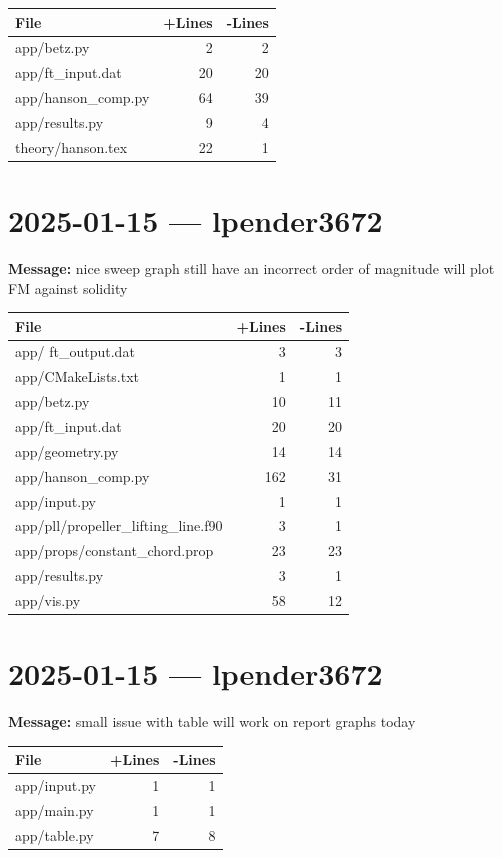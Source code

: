 \documentclass{article}
\begin{document}
\begin{longtable}{|p{10cm}|r|r|}
\hline \textbf{File} & \textbf{+Lines} & \textbf{-Lines} \\
\hline
app/betz.py & 2 & 2 \\
\hline
app/ft\_input.dat & 20 & 20 \\
\hline
app/hanson\_comp.py & 64 & 39 \\
\hline
app/results.py & 9 & 4 \\
\hline
theory/hanson.tex & 22 & 1 \\
\hline
\end{longtable}

\section*{2025-01-15 --- lpender3672}
\textbf{Message:} nice sweep graph still have an incorrect order of magnitude will plot FM against solidity

\begin{longtable}{|p{10cm}|r|r|}
\hline \textbf{File} & \textbf{+Lines} & \textbf{-Lines} \\
\hline
app/ ft\_output.dat & 3 & 3 \\
\hline
app/CMakeLists.txt & 1 & 1 \\
\hline
app/betz.py & 10 & 11 \\
\hline
app/ft\_input.dat & 20 & 20 \\
\hline
app/geometry.py & 14 & 14 \\
\hline
app/hanson\_comp.py & 162 & 31 \\
\hline
app/input.py & 1 & 1 \\
\hline
app/pll/propeller\_lifting\_line.f90 & 3 & 1 \\
\hline
app/props/constant\_chord.prop & 23 & 23 \\
\hline
app/results.py & 3 & 1 \\
\hline
app/vis.py & 58 & 12 \\
\hline
\end{longtable}

\section*{2025-01-15 --- lpender3672}
\textbf{Message:} small issue with table will work on report graphs today

\begin{longtable}{|p{10cm}|r|r|}
\hline \textbf{File} & \textbf{+Lines} & \textbf{-Lines} \\
\hline
app/input.py & 1 & 1 \\
\hline
app/main.py & 1 & 1 \\
\hline
app/table.py & 7 & 8 \\
\hline
\end{longtable}
\end{document}
